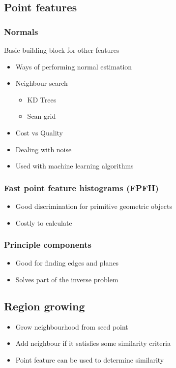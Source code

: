 	\subsection{Point features}
		\subsubsection{Normals}
			Basic building block for other features
			\begin{itemize}
			\item Ways of performing normal estimation
			\item Neighbour search
				\begin{itemize}
				\item KD Trees
				\item Scan grid
				\end{itemize}
			\item Cost vs Quality
			\item Dealing with noise
			\item Used with machine learning algorithms
			\end{itemize}
				
		\subsubsection{Fast point feature histograms (FPFH)}
			\begin{itemize}
			\item Good discrimination for primitive geometric objects
			\item Costly to calculate
			\end{itemize}
			
		\subsubsection{Principle components}
			\begin{itemize}					
			\item Good for finding edges and planes
			\item Solves part of the inverse problem
			\end{itemize}
			

	\subsection{Region growing}
		\begin{itemize}
		\item Grow neighbourhood from seed point
		\item Add neighbour if it satisfies some similarity criteria
		\item Point feature can be used to determine similarity
		\end{itemize}


